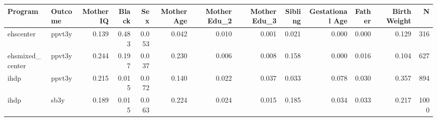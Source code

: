 \begin{table}[ht]
\centering
\begin{tabular}{llrrrrrrrrrrr}
  \hline
Program & Outcome & Mother IQ & Black & Sex & Mother Age & Mother Edu\_2 & Mother Edu\_3 & Sibling & Gestational Age & Father & Birth Weight & N \\ 
  \hline
ehscenter & ppvt3y & 0.139 & 0.483 & 0.053 & 0.042 & 0.010 & 0.001 & 0.021 & 0.000 & 0.000 & 0.129 & 316 \\ 
  ehsmixed\_center & ppvt3y & 0.244 & 0.197 & 0.037 & 0.230 & 0.006 & 0.008 & 0.158 & 0.000 & 0.016 & 0.104 & 627 \\ 
  ihdp & ppvt3y & 0.215 & 0.015 & 0.072 & 0.140 & 0.022 & 0.037 & 0.033 & 0.078 & 0.030 & 0.357 & 894 \\ 
  ihdp & sb3y & 0.189 & 0.015 & 0.063 & 0.224 & 0.024 & 0.015 & 0.185 & 0.034 & 0.033 & 0.217 & 1000 \\ 
   \hline
\end{tabular}
\end{table}
